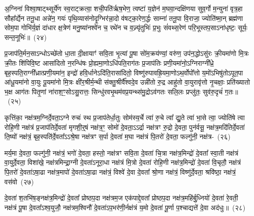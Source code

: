 {\anuvakamend[{व्या॒नं मे॒ द्वात्रिꣳ॑शच्च}]}

अ॒ग्निना॑ विश्वा॒षाट्थ्सूर्ये॑ण स्व॒राट्क्रत्वा॒ शची॒पति॑र्\mbox{}ऋष॒भेण॒ त्वष्टा॑ य॒ज्ञेन॑ म॒घवा॒न्दक्षि॑णया सुव॒र्गो म॒न्युना॑ वृत्र॒हा सौहा᳚र्द्येन तनू॒धा अन्ने॑न॒ गयः॑ पृथि॒व्यास॑नोदृ॒ग्भिर॑न्ना॒दो व॑षट्का॒रेण॒र्द्धः साम्ना॑ तनू॒पा वि॒राजा॒ ज्योति॑ष्मा॒न् ब्रह्म॑णा सोम॒पा गोभि॑र्य॒ज्ञं दा॑धार क्ष॒त्रेण॑ मनु॒ष्या॑नश्वे॑न च॒ रथे॑न च व॒ज्र्यृ॑तुभिः॑ प्र॒भुः सं॑वथ्स॒रेण॑ परि॒भूस्तप॒सा\-ऽ\-ना॑धृष्टः॒ सूर्यः॒ सन्त॒नूभिः॑॥~(२४)\ip

{\anuvakamend[{अ॒ग्निनैका॒न्नप॑ञ्चा॒शत्}]}

प्र॒जा\-प॑ति॒र्मन॒सा\-ऽ\-न्धो\-ऽच्छे॑तो धा॒ता दी॒क्षायाꣳ॑ सवि॒ता भृ॒त्यां पू॒षा सो॑म॒क्रय॑ण्यां॒ वरु॑ण॒ उप॑न॒द्धो\-ऽसु॑रः क्री॒यमा॑णो मि॒त्रः क्री॒तः शि॑पिवि॒ष्ट आसा॑दितो न॒रन्धि॑षः प्रो॒ह्यमा॒णो\-ऽधि॑\-पति॒राग॑तः प्र॒जा\-प॑तिः प्रणी॒यमा॑नो॒\-ऽग्निराग्नी᳚ध्रे॒ बृह॒स्पति॒राग्नी᳚ध्रात्प्रणी॒यमा॑न॒ इन्द्रो॑ हवि॒र्धाने\-ऽदि॑ति॒रासा॑दितो॒ विष्णु॑रुपावह्रि॒यमा॒णो\-ऽथ॒र्वोपो᳚त्तो य॒मो॑\-ऽभिषु॑तो\-ऽपूत॒पा आ॑धू॒यमा॑नो वा॒युः पू॒यमा॑नो मि॒त्रः क्षी॑र॒श्रीर्म॒न्थी स॑क्तु॒श्रीर्वै᳚श्वदे॒व उन्नी॑तो रु॒द्र आहु॑तो वा॒युरावृ॑त्तो नृ॒चक्षाः॒ प्रति॑ख्यातो भ॒क्ष आग॑तः पितृ॒णां ना॑राश॒ꣳ॒सो\-ऽसु॒रात्तः॒ सिन्धु॑रवभृ॒थम॑वप्र॒यन्थ्स॑मु॒द्रो\-ऽव॑गतः सलि॒लः प्रप्लु॑तः॒ सुव॑रु॒दृचं॑ ग॒तः॥~(२५)\ip

{\anuvakamend[{रु॒द्र एक॑विꣳशतिश्च}]}

कृत्ति॑का॒ नक्ष॑त्रम॒ग्निर्दे॒वता॒ऽग्ने रुचः॑ स्थ प्र॒जा\-प॑तेर्धा॒तुः सोम॑स्य॒र्चे त्वा॑ रु॒चे त्वा᳚ द्यु॒ते त्वा॑ भा॒से त्वा॒ ज्योति॑षे त्वा रोहि॒णी नक्ष॑त्रं प्र॒जा\-प॑तिर्दे॒वता॑ मृगशी॒र्॒\mbox{}षं नक्ष॑त्र॒ꣳ॒ सोमो॑ दे॒वता॒ऽऽर्द्रा नक्ष॑त्रꣳ रु॒द्रो दे॒वता॒ पुन॑र्वसू॒ नक्ष॑त्र॒मदि॑ति\-र्दे॒वता॑ ति॒ष्यो॑ नक्ष॑त्रं॒ बृह॒स्पति॑र्दे॒वता᳚ऽऽश्रे॒षा नक्ष॑त्रꣳ स॒र्पा दे॒वता॑ म॒घा नक्ष॑त्रं पि॒तरो॑ दे॒वता॒ फल्गु॑नी॒ नक्ष॑त्र-~(२६)\ip

मर्य॒मा दे॒वता॒ फल्गु॑नी॒ नक्ष॑त्रं॒ भगो॑ दे॒वता॒ हस्तो॒ नक्ष॑त्रꣳ सवि॒ता दे॒वता॑ चि॒त्रा नक्ष॑त्र॒मिन्द्रो॑ दे॒वता᳚ स्वा॒ती नक्ष॑त्रं वा॒युर्दे॒वता॒ विशा॑खे॒ नक्ष॑त्रमिन्द्रा॒ग्नी दे॒वता॑\-ऽनूरा॒धा नक्ष॑त्रं मि॒त्रो दे॒वता॑ रोहि॒णी नक्ष॑त्र॒मिन्द्रो॑ दे॒वता॑ वि॒चृतौ॒ नक्ष॑त्रं पि॒तरो॑ दे॒वता॑ऽषा॒ढा नक्ष॑त्र॒मापो॑ दे॒वता॑ऽषा॒ढा नक्ष॑त्रं॒ विश्वे॑ दे॒वा दे॒वता᳚ श्रो॒णा नक्ष॑त्रं॒ विष्णु॑र्दे॒वता॒ श्रवि॑ष्ठा॒ नक्ष॑त्रं॒ वस॑वो~(२७)\ip

दे॒वता॑ श॒तभि॑ष॒ङ्नक्ष॑त्र॒मिन्द्रो॑ दे॒वता᳚ प्रोष्ठप॒दा नक्ष॑त्रम॒ज एक॑पाद्दे॒वता᳚ प्रोष्ठप॒दा नक्ष॑त्र॒महि॑र्बु॒ध्नियो॑ दे॒वता॑ रे॒वती॒ नक्ष॑त्रं पू॒षा दे॒वता᳚\-ऽ\-श्व॒युजौ॒ नक्ष॑त्रम॒श्विनौ॑ दे॒वता॑ऽप॒\-भर॑णी॒र्नक्ष॑त्रं य॒मो दे॒वता॑ पू॒र्णा प॒श्चाद्यत्ते॑ दे॒वा अद॑धुः॥~(२८)\ip


